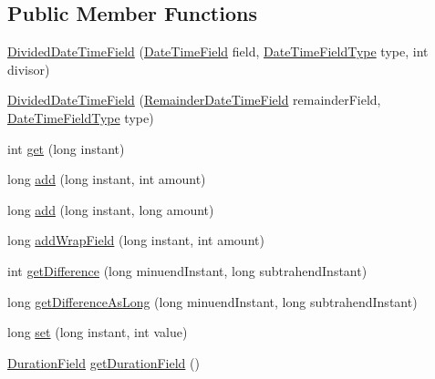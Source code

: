\subsection*{Public Member Functions}
\begin{DoxyCompactItemize}
\item 
\hyperlink{classorg_1_1joda_1_1time_1_1field_1_1_divided_date_time_field_a4c0c824d5120421bbada399f74d122dd}{Divided\-Date\-Time\-Field} (\hyperlink{classorg_1_1joda_1_1time_1_1_date_time_field}{Date\-Time\-Field} field, \hyperlink{classorg_1_1joda_1_1time_1_1_date_time_field_type}{Date\-Time\-Field\-Type} type, int divisor)
\item 
\hyperlink{classorg_1_1joda_1_1time_1_1field_1_1_divided_date_time_field_ae55437722152146285d8ec858dbab51e}{Divided\-Date\-Time\-Field} (\hyperlink{classorg_1_1joda_1_1time_1_1field_1_1_remainder_date_time_field}{Remainder\-Date\-Time\-Field} remainder\-Field, \hyperlink{classorg_1_1joda_1_1time_1_1_date_time_field_type}{Date\-Time\-Field\-Type} type)
\item 
int \hyperlink{classorg_1_1joda_1_1time_1_1field_1_1_divided_date_time_field_a706fee5929e7b887d560889134c9ad20}{get} (long instant)
\item 
long \hyperlink{classorg_1_1joda_1_1time_1_1field_1_1_divided_date_time_field_a7732726ba3c05b4076cf80c50f82c2d4}{add} (long instant, int amount)
\item 
long \hyperlink{classorg_1_1joda_1_1time_1_1field_1_1_divided_date_time_field_a4c98e594dbe95ef86d8fa364b68219f1}{add} (long instant, long amount)
\item 
long \hyperlink{classorg_1_1joda_1_1time_1_1field_1_1_divided_date_time_field_a00ff6c6b186806e384731ee89c32c8f3}{add\-Wrap\-Field} (long instant, int amount)
\item 
int \hyperlink{classorg_1_1joda_1_1time_1_1field_1_1_divided_date_time_field_a4536d8c9f33814d494a4cf5f8058aa0b}{get\-Difference} (long minuend\-Instant, long subtrahend\-Instant)
\item 
long \hyperlink{classorg_1_1joda_1_1time_1_1field_1_1_divided_date_time_field_a90a71fba08cd4d64919d8edf661a81db}{get\-Difference\-As\-Long} (long minuend\-Instant, long subtrahend\-Instant)
\item 
long \hyperlink{classorg_1_1joda_1_1time_1_1field_1_1_divided_date_time_field_ac0c45a41709ae12c4592a54d68eac4f6}{set} (long instant, int value)
\item 
\hyperlink{classorg_1_1joda_1_1time_1_1_duration_field}{Duration\-Field} \hyperlink{classorg_1_1joda_1_1time_1_1field_1_1_divided_date_time_field_a50e81f0996b8cdf7c510e62f2d5a9e48}{get\-Duration\-Field} ()

\end{DoxyCompactItemize}

